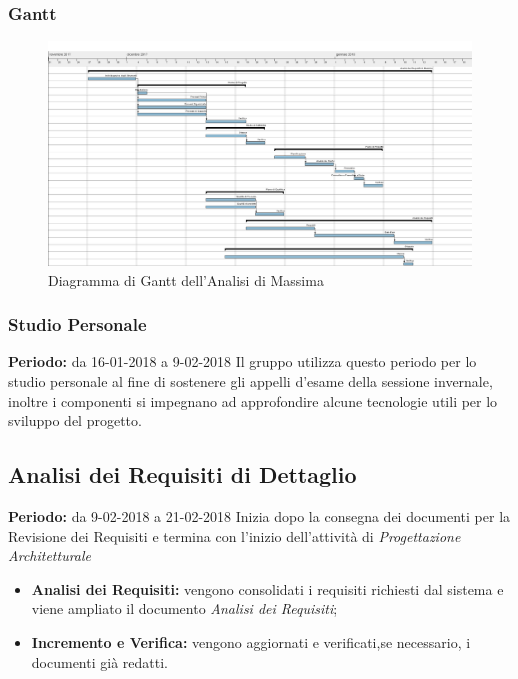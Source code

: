 \subsubsection{Gantt}
\begin{figure}[H]
	\centering 
	\includegraphics[width=1\textwidth]{images/Analisi-di-Massima.png}
	\caption{Diagramma di Gantt dell'Analisi di Massima}
	\label{graficobello} 
\end{figure}
\subsubsection{Studio Personale}
\textbf{Periodo:} da 16-01-2018 a 9-02-2018 \Spazio
Il gruppo utilizza questo periodo per lo studio personale al fine di sostenere gli appelli d'esame della sessione invernale, inoltre i componenti si impegnano ad approfondire alcune tecnologie utili per lo sviluppo del progetto.
\subsection{Analisi dei Requisiti di Dettaglio}
    \textbf{Periodo:} da 9-02-2018 a 21-02-2018 \Spazio
    Inizia dopo la consegna dei documenti per la Revisione dei Requisiti e termina con l'inizio dell'attività di \emph{Progettazione Architetturale}
    \begin{itemize}
    	\item \textbf{Analisi dei Requisiti:} vengono consolidati i requisiti richiesti dal sistema e viene ampliato il documento \emph{Analisi dei Requisiti};
    	\item \textbf{Incremento e Verifica:} vengono aggiornati e verificati,se necessario, i documenti già redatti. 
    \end{itemize}
